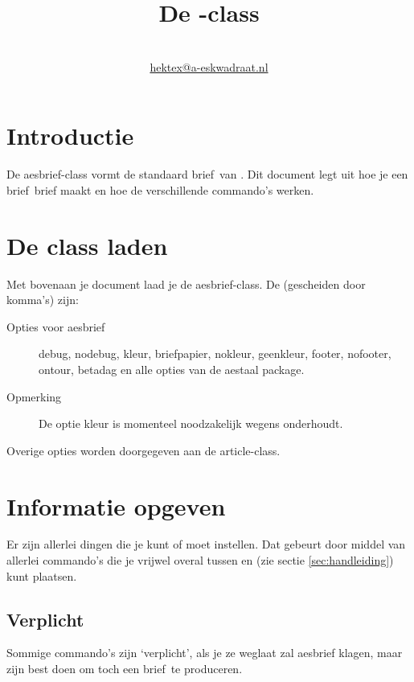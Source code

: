 \documentclass{article}
\title{De \classsf-class} %
\author{\aeskwadraat \TeXniCie\\
\url{hektex@a-eskwadraat.nl}}
\newcommand\meta[1]{\placeholder[#1]}
\newcommand\classnaam{aesbrief}%
\newcommand\classsf{\textsf{\classnaam}}
\newcommand\funktie{\aesnaam brief}%
\begin{document}
\maketitle


\section{Introductie}%

De \classsf-class vormt de standaard \funktie \ van \aeskwadraat.
Dit document legt uit hoe je een \funktie \ brief maakt en hoe de verschillende commando's werken.


\section{De class laden}

Met \cmdarg[opt]{\meta{opties}}\cmdarg{\classnaam} bovenaan je document laad je de \classsf-class.
De \meta{opties} (gescheiden door komma's) zijn:

\begin{description}
\item[Opties voor \classnaam] 
debug, nodebug, kleur, briefpapier, nokleur, geenkleur, footer, nofooter, ontour, betadag en alle opties van de aestaal package.
\item[Opmerking] De optie kleur is momenteel noodzakelijk wegens onderhoudt.
\end{description}

Overige opties worden doorgegeven aan de article-class.

\section{Informatie opgeven} %

Er zijn allerlei dingen die je kunt of moet instellen. Dat gebeurt door middel
van allerlei commando's die je vrijwel overal tussen \class{\classnaam} 
en  (zie sectie \ref{sec:handleiding}) kunt plaatsen.

\subsection{Verplicht}

Sommige commando's zijn `verplicht', als je ze weglaat
zal \classsf{} klagen, maar zijn best doen om toch een \funktie \ te produceren.
\end{document}

